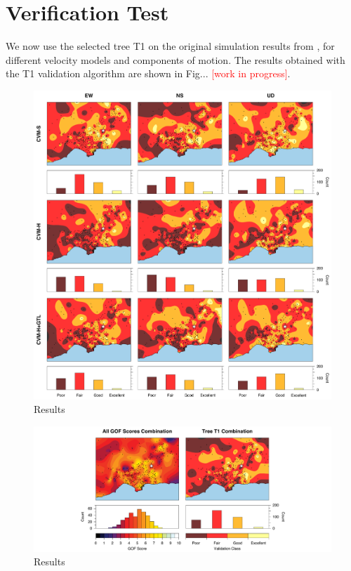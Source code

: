 
\section{Verification Test}

We now use the selected tree T1 on the original simulation results from \citet{Taborda_2014_BSSA}, for different velocity models and components of motion. The results obtained with the T1 validation algorithm are shown in Fig... \textcolor{red}{[work in progress]}. 



\begin{figure}[t]
	\centering
	\includegraphics[width=\textwidth]{figures/pdf/figure-10}
	\caption{Results}
	\label{fig:res-gof-maps}
\end{figure}

\begin{figure}[t]
	\centering
	\includegraphics[width=\textwidth]{figures/pdf/figure-11}
	\caption{Results}
	\label{fig:avg-gof-maps}
\end{figure}
